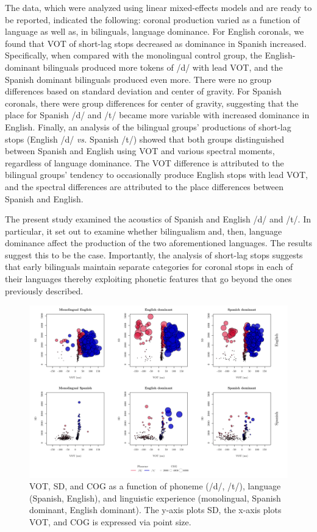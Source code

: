 \documentclass[11pt]{article}
\begin{document}
The data, which were analyzed using linear mixed-effects models and are ready to be reported, indicated the following: coronal production varied as a function of language as well as, in bilinguals, language dominance. For English coronals, we found that VOT of short-lag stops decreased as dominance in Spanish increased. Specifically, when compared with the monolingual control group, the English-dominant bilinguals produced more tokens of /d/ with lead VOT, and the Spanish dominant bilinguals produced even more. There were no group differences based on standard deviation and center of gravity. For Spanish coronals, there were group differences for center of gravity, suggesting that the place for Spanish /d/ and /t/ became more variable with increased dominance in English. Finally, an analysis of the bilingual groups' productions of short-lag stops (English /d/ \emph{vs.} Spanish /t/) showed that both groups distinguished between Spanish and English using VOT and various spectral moments, regardless of language dominance. The VOT difference is attributed to the bilingual groups' tendency to occasionally produce English stops with lead VOT, and the spectral differences are attributed to the place differences between Spanish and English.

The present study examined the acoustics of Spanish and English /d/ and /t/. In particular, it set out to examine whether bilingualism and, then, language dominance affect the production of the two aforementioned languages. The results suggest this to be the case. Importantly, the analysis of short-lag stops suggests that early bilinguals maintain separate categories for coronal stops in each of their languages thereby exploiting phonetic features that go beyond the ones previously described.


\pagebreak

\begin{figure}[!h]
	\centering
	\includegraphics[width=\textwidth]{figures/all.pdf}
	\caption{VOT, SD, and COG as a function of phoneme (/d/, /t/), language (Spanish, English), and linguistic experience (monolingual, Spanish dominant, English dominant). The y-axis plots SD, the x-axis plots VOT, and COG is expressed via point size.}
	\label{fig:1}
\end{figure}
\end{document}
